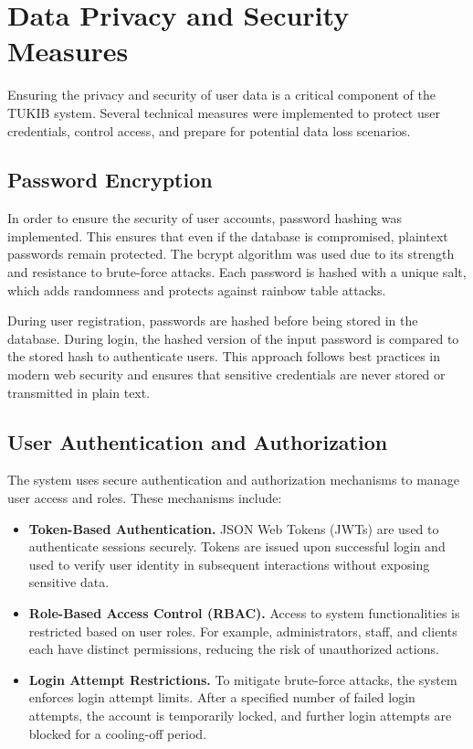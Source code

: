 \section{Data Privacy and Security Measures}

Ensuring the privacy and security of user data is a critical component of the TUKIB system. Several technical measures were implemented to protect user credentials, control access, and prepare for potential data loss scenarios.

\subsection{Password Encryption}

In order to ensure the security of user accounts, password hashing was implemented. This ensures that even if the database is compromised, plaintext passwords remain protected. The bcrypt algorithm was used due to its strength and resistance to brute-force attacks. Each password is hashed with a unique salt, which adds randomness and protects against rainbow table attacks.

During user registration, passwords are hashed before being stored in the database. During login, the hashed version of the input password is compared to the stored hash to authenticate users. This approach follows best practices in modern web security and ensures that sensitive credentials are never stored or transmitted in plain text.

\subsection{User Authentication and Authorization}

The system uses secure authentication and authorization mechanisms to manage user access and roles. These mechanisms include:

\begin{itemize}
	\item \textbf{Token-Based Authentication.} JSON Web Tokens (JWTs) are used to authenticate sessions securely. Tokens are issued upon successful login and used to verify user identity in subsequent interactions without exposing sensitive data.
	\item \textbf{Role-Based Access Control (RBAC).} Access to system functionalities is restricted based on user roles. For example, administrators, staff, and clients each have distinct permissions, reducing the risk of unauthorized actions.
	\item \textbf{Login Attempt Restrictions.} To mitigate brute-force attacks, the system enforces login attempt limits. After a specified number of failed login attempts, the account is temporarily locked, and further login attempts are blocked for a cooling-off period.
\end{itemize}

